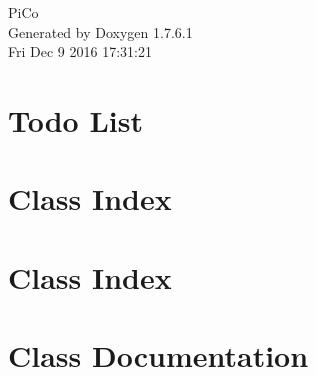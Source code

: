 \documentclass[a4paper]{book}
\begin{document}
\hypersetup{pageanchor=false,citecolor=blue}
\begin{titlepage}
\vspace*{7cm}
\begin{center}
{\Large \-Pi\-Co }\\
\vspace*{1cm}
{\large \-Generated by Doxygen 1.7.6.1}\\
\vspace*{0.5cm}
{\small Fri Dec 9 2016 17:31:21}\\
\end{center}
\end{titlepage}
\clearemptydoublepage
{}
\tableofcontents
\clearemptydoublepage
{}
\hypersetup{pageanchor=true,citecolor=blue}
\chapter{\-Todo \-List}
\label{todo}
\hypertarget{todo}{}

\chapter{\-Class \-Index}

\chapter{\-Class \-Index}

\chapter{\-Class \-Documentation}



































\printindex
\end{document}
